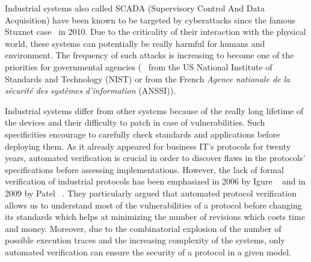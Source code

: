 Industrial systems also called SCADA (Supervisory Control And Data
Acquisition) have been known to be targeted by cyberattacks since the
famous Stuxnet case~\cite{Lan11} in 2010.  Due to the criticality of
their interaction with the physical world, these systems can
potentially be really harmful for humans and environment.  The
frequency of such attacks is increasing to become one of the priorities for
governmental agencies (\eg~\cite{SFS11} from the US National Institute of
Standards and Technology (NIST) or
\cite{ANSSI12_guide_securite_industrielle_en} from the French {\em Agence
nationale de la sécurité des systèmes d'information} (ANSSI)).


Industrial systems differ from other systems because of
the really long lifetime of the devices and their difficulty to
patch in case of vulnerabilities.
Such specificities encourage to carefully check
standards and applications before deploying them.
As it already appeared for business IT's protocols for twenty years,
automated verification is crucial in order to discover flaws in the
protocols' specifications before assessing implementations. However,
the lack of formal verification of industrial protocols has been
emphasized in 2006 by Igure \etal~\cite{ILW06} and in 2009 by
Patel \emph{\etal}~\cite{PBG09}.  They particularly argued that
automated protocol verification allows us to understand most of the
vulnerabilities of a protocol before changing its standards which
helps at minimizing the number of revisions which costs time and
money.  Moreover, due to the combinatorial explosion of the number of
possible execution traces and the increasing complexity of the
systems, only automated verification can ensure the security of a
protocol in a given model.

